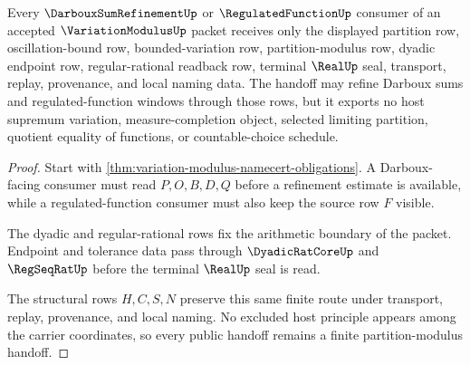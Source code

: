 \begin{theorem}
\label{thm:variation-modulus-darboux-regulated-handoff}
Every $\DarbouxSumRefinementUp$ or $\RegulatedFunctionUp$ consumer of an accepted $\VariationModulusUp$ packet receives only the displayed partition row, oscillation-bound row, bounded-variation row, partition-modulus row, dyadic endpoint row, regular-rational readback row, terminal $\RealUp$ seal, transport, replay, provenance, and local naming data. The handoff may refine Darboux sums and regulated-function windows through those rows, but it exports no host supremum variation, measure-completion object, selected limiting partition, quotient equality of functions, or countable-choice schedule.
\end{theorem}
\begin{proof}
Start with \autoref{thm:variation-modulus-namecert-obligations}. A Darboux-facing consumer must read $P,O,B,D,Q$ before a refinement estimate is available, while a regulated-function consumer must also keep the source row $F$ visible.

The dyadic and regular-rational rows fix the arithmetic boundary of the packet. Endpoint and tolerance data pass through $\DyadicRatCoreUp$ and $\RegSeqRatUp$ before the terminal $\RealUp$ seal is read.

The structural rows $H,C,S,N$ preserve this same finite route under transport, replay, provenance, and local naming. No excluded host principle appears among the carrier coordinates, so every public handoff remains a finite partition-modulus handoff.
\end{proof}




